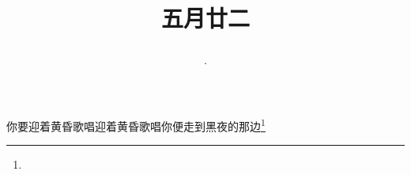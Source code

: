 \title{\date[d=27,m=6,y=2024][year:cn-y,年,month:cn,day:cn,日,·,weekday]·五月廿二 }
你要迎着黄昏歌唱迎着黄昏歌唱你便走到黑夜的那边\footnote{ }


